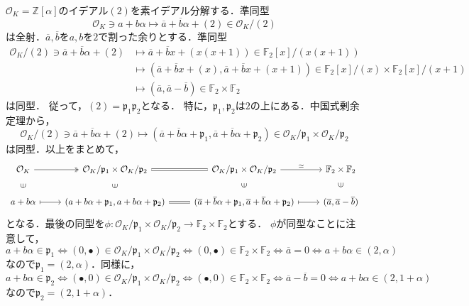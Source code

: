 $\mathcal{O}_K=\mathbb{Z}[\alpha]$のイデアル$(2)$を素イデアル分解する．準同型
\[ \mathcal{O}_K\ni a+b\alpha \mapsto \overline{a}+\overline{b}\alpha+(2)\in\mathcal{O}_K/(2) \]
は全射．$\overline{a},\overline{b}$を$a,b$を$2$で割った余りとする．準同型
\begin{align*}
  \mathcal{O}_K/(2)\ni\overline{a}+\overline{b}\alpha+(2) &\mapsto \overline{a}+\overline{b}x+(x(x+1))\in\mathbb{F}_2[x]/(x(x+1))\\
  &\mapsto(\overline{a}+\overline{b}x+(x),\overline{a}+\overline{b}x+(x+1))\in\mathbb{F}_2[x]/(x)\times\mathbb{F}_2[x]/(x+1)\\
  &\mapsto(\overline{a},\overline{a}-\overline{b})\in\mathbb{F}_2\times\mathbb{F}_2
\end{align*}
は同型．
従って，$(2)=\mathfrak{p}_1\mathfrak{p}_2$となる．
特に，$\mathfrak{p}_1,\mathfrak{p}_2$は$2$の上にある．中国式剰余定理から，
\[\mathcal{O}_K/(2)\ni\overline{a} + \overline{b}\alpha+(2) \mapsto (\overline{a} + \overline{b}\alpha + \mathfrak{p}_1, \overline{a} + \overline{b}\alpha + \mathfrak{p}_2) \in\mathcal{O}_K/\mathfrak{p}_1 \times \mathcal{O}_K/\mathfrak{p}_2\]
は同型．以上をまとめて，
\[
\begin{tikzcd}
  \mathcal{O}_K \arrow[r, twoheadrightarrow]\arrow[d, phantom, "\ni" sloped]
  & \mathcal{O}_K/\mathfrak{p}_1\times\mathcal{O}_K/\mathfrak{p}_2 \arrow[r, equal]\arrow[d, phantom, "\ni" sloped]
  & \mathcal{O}_K/\mathfrak{p}_1\times\mathcal{O}_K/\mathfrak{p}_2 \arrow[r, "\simeq"]\arrow[d, phantom, "\ni" sloped]
  & \mathbb{F}_2\times\mathbb{F}_2 \arrow[d, phantom, "\ni" sloped]\\
  a+b\alpha \arrow[r, mapsto] & (a+b\alpha+\mathfrak{p}_1,a+b\alpha+\mathfrak{p}_2) \arrow[r, equal]
  & (\overline{a}+\overline{b}\alpha+\mathfrak{p}_1,\overline{a}+\overline{b}\alpha+\mathfrak{p}_2) \arrow[r, mapsto]
  & (\overline{a},\overline{a}-\overline{b})
\end{tikzcd}
\]
となる．最後の同型を$\phi\colon\mathcal{O}_K/\mathfrak{p}_1\times\mathcal{O}_K/\mathfrak{p}_2\to\mathbb{F}_2\times\mathbb{F}_2$とする．
$\phi$が同型なことに注意して，
\[a+b\alpha\in\mathfrak{p}_1\Leftrightarrow(0,\bullet)\in\mathcal{O}_K/\mathfrak{p}_1\times\mathcal{O}_K/\mathfrak{p}_2\Leftrightarrow(0,\bullet)\in\mathbb{F}_2\times\mathbb{F}_2\Leftrightarrow\overline{a}=0\Leftrightarrow a+b\alpha\in(2,\alpha)\]
なので$\mathfrak{p}_1=(2,\alpha)$．同様に，
\[a+b\alpha\in\mathfrak{p}_2\Leftrightarrow(\bullet,0)\in\mathcal{O}_K/\mathfrak{p}_1\times\mathcal{O}_K/\mathfrak{p}_2\Leftrightarrow(\bullet,0)\in\mathbb{F}_2\times\mathbb{F}_2\Leftrightarrow\overline{a}-\overline{b}=0\Leftrightarrow a+b\alpha\in(2,1+\alpha)\]
なので$\mathfrak{p}_2=(2,1+\alpha)$．

